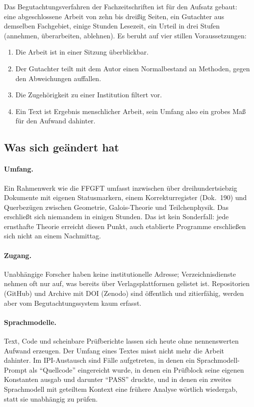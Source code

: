 Das Begutachtungsverfahren der Fachzeitschriften ist für den Aufsatz gebaut: eine
abgeschlossene Arbeit von zehn bis dreißig Seiten, ein Gutachter aus demselben
Fachgebiet, einige Stunden Lesezeit, ein Urteil in drei Stufen (annehmen, überarbeiten,
ablehnen). Es beruht auf vier stillen Voraussetzungen:
\begin{enumerate}
\item Die Arbeit ist in einer Sitzung überblickbar.
\item Der Gutachter teilt mit dem Autor einen Normalbestand an Methoden, gegen den
  Abweichungen auffallen.
\item Die Zugehörigkeit zu einer Institution filtert vor.
\item Ein Text ist Ergebnis menschlicher Arbeit, sein Umfang also ein grobes Maß für den
  Aufwand dahinter.
\end{enumerate}

\subsection{Was sich geändert hat}

\paragraph{Umfang.} Ein Rahmenwerk wie die FFGFT umfasst inzwischen über
dreihundertsiebzig Dokumente mit eigenen Statusmarkern, einem Korrekturregister
(Dok.~190) und Querbezügen zwischen Geometrie, Galois-Theorie und Teilchenphysik.
Das erschließt sich niemandem in einigen Stunden. Das ist kein Sonderfall: jede
ernsthafte Theorie erreicht diesen Punkt, auch etablierte Programme erschließen sich
nicht an einem Nachmittag.

\paragraph{Zugang.} Unabhängige Forscher haben keine institutionelle Adresse;
Verzeichnisdienste nehmen oft nur auf, was bereits über Verlagsplattformen gelistet
ist. Repositorien (GitHub) und Archive mit DOI (Zenodo) sind öffentlich und
zitierfähig, werden aber vom Begutachtungssystem kaum erfasst.

\paragraph{Sprachmodelle.} Text, Code und scheinbare Prüfberichte lassen sich heute
ohne nennenswerten Aufwand erzeugen. Der Umfang eines Textes misst nicht mehr die
Arbeit dahinter. Im IPI-Austausch sind Fälle aufgetreten, in denen ein Sprachmodell-Prompt
als \enquote{Quellcode} eingereicht wurde, in denen ein Prüfblock seine eigenen
Konstanten ausgab und darunter \enquote{PASS} druckte, und in denen ein zweites
Sprachmodell mit geteiltem Kontext eine frühere Analyse wörtlich wiedergab, statt sie
unabhängig zu prüfen.

